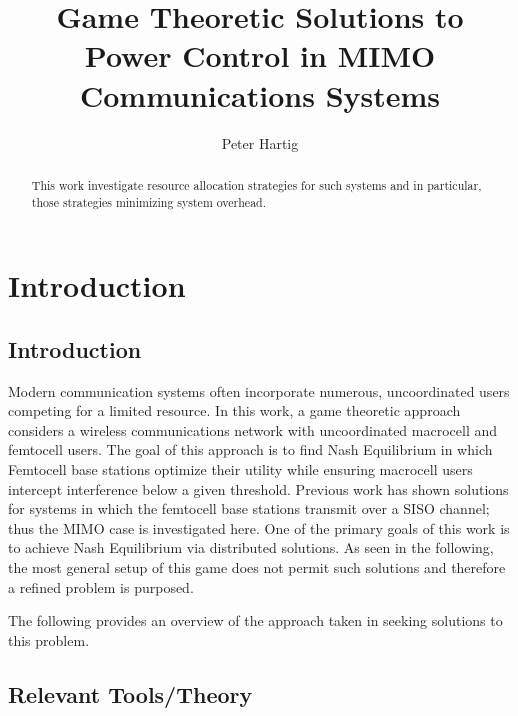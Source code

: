 \documentclass[12pt,a4paper]{report}
\title{Game Theoretic Solutions to Power Control in MIMO Communications Systems}
\author{Peter Hartig}
\begin{document}
\maketitle

\begin{abstract}
This work investigate resource allocation strategies for such systems and in particular, those strategies minimizing system overhead. 
\end{abstract}

\newpage
\tableofcontents
\newpage

\chapter{Introduction}
\section{Introduction}
Modern communication systems often incorporate numerous, uncoordinated users competing for a limited resource.
In this work, a game theoretic approach considers a wireless communications network with uncoordinated  macrocell and femtocell users. The goal of this approach is to find Nash Equilibrium in which Femtocell base stations optimize their utility while ensuring macrocell users intercept interference below a given threshold. 
Previous work has shown solutions for systems in which the femtocell base stations transmit over a SISO channel; thus the MIMO case is investigated here. 
One of the primary goals of this work is to achieve Nash Equilibrium via distributed solutions. As seen in the following, the most general setup of this game does not permit such solutions and therefore a refined problem is purposed.

The following provides an overview of the approach taken in seeking solutions to this problem.

\section{Relevant Tools/Theory}
\end{document}
